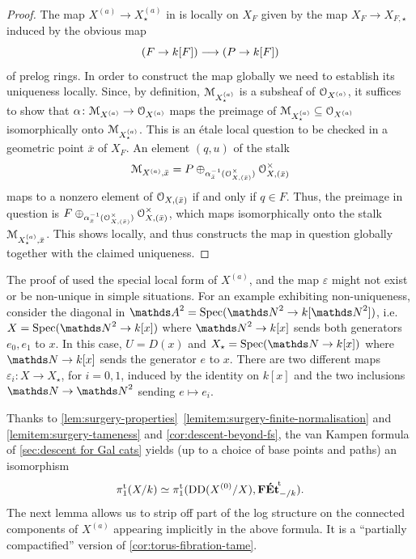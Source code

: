 \begin{proof}
The map $X^{(a)}\to X^{(a)}_\star$ in  is locally on $X_F$ given by  the map $X_F\to X_{F,\star}$ induced by the obvious map 
\[
(F \to k[F]) \longrightarrow (P \to k[F])
\]
of prelog rings. In order to construct the map globally we need to establish its uniqueness locally. 
Since, by definition, ${\mathcal M}_{X^{(a)}_\star}$ is a subsheaf of ${\mathcal O}_{X^{(a)}}$, it suffices to show that $\alpha\colon {\mathcal M}_{X^{(a)}}\to{\mathcal O}_{X^{(a)}}$ maps the preimage of ${\mathcal M}_{X^{(a)}_\star}\subseteq {\mathcal O}_{X^{(a)}}$ isomorphically onto ${\mathcal M}_{X^{(a)}_\star}$. This is an \'etale  local question to be checked in a geometric point $\bar{x}$ of $X_F$.  An element $(q,u)$ of the stalk 
\[
{\mathcal M}_{X^{(a)},\bar x} = P\oplus_{\alpha_{\bar x}^{-1}({\mathcal O}_{X,(\bar x)}^\times)} {\mathcal O}_{X,(\bar x)}^\times
\]
maps to a nonzero element of ${\mathcal O}_{X,(\bar x)}$ if and only if $q\in F$. Thus, the preimage in question is $F\oplus_{\alpha_{\bar x}^{-1}({\mathcal O}_{X,(\bar x)}^\times)} {\mathcal O}_{X,(\bar x)}^\times$, which maps isomorphically onto the stalk ${\mathcal M}_{X^{(a)}_\star, \bar x}$. This shows  locally, and thus constructs the map in question globally together with the claimed uniqueness.
\end{proof}

\begin{rmk}
    The proof of  used the special local form of $X^{(a)}$, and the map $\varepsilon$ might not exist or be non-unique in simple situations. For an example exhibiting non-uniqueness, consider the diagonal in $\bA^2 = \Spec(\bN^2\to k[\bN^2])$, i.e.\ $X=\Spec(\bN^2\to k[x])$ where $\bN^2\to k[x]$ sends both generators $e_0,e_1$ to $x$. In this case, $U=D(x)$ and $X_\star = \Spec(\bN\to k[x])$ where $\bN\to k[x]$ sends the generator $e$ to $x$. There are two different maps $\varepsilon_i\colon X \to X_\star$, for $i=0,1$, induced by the identity on $k[x]$ and the two inclusions $\bN\to\bN^2$ sending $e\mapsto e_i$.
\end{rmk}

Thanks to \cref{lem:surgery-properties}~\ref{lemitem:surgery-finite-normalisation} and \ref{lemitem:surgery-tameness} and \cref{cor:descent-beyond-fs}, the van Kampen formula of \cref{sec:descent for Gal cats} yields (up to a choice of base points and paths) an isomorphism
\[ 
    \pi_1^{\mathrm{t}}(X/k) \simeq \pi_1^{\mathrm{t}}(\operatorname{DD}(X^{(0)}/X), {\mathbf{F\acute{E}t}}^{\!\mathrm{t}}_{-/k}).
\]
The next lemma allows us to strip off part of the log structure on the connected components of $X^{(a)}$ appearing implicitly in the above formula. It is a ``partially compactified'' version of \cref{cor:torus-fibration-tame}.

